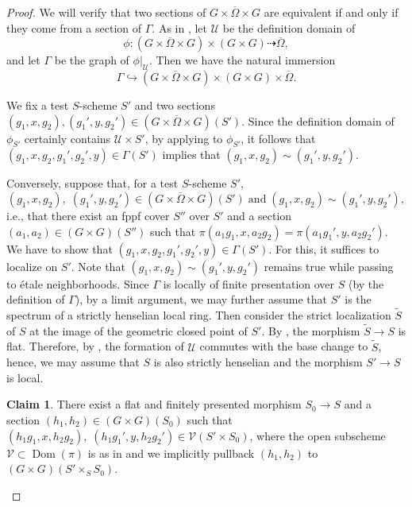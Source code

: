 \documentclass[11pt, reqno]{amsart}
\theoremstyle{plain}
\theoremstyle{definition}
\newtheorem{claim}[theorem]{Claim}
\DeclareMathOperator{\Dom}{Dom} %
\begin{document}
\begin{proof}
    We will verify that two sections of $G\times \overline{\Omega}\times G$ are equivalent if and only if they come from a section of $\Gamma$.
    As in , let $\mathcal{U}$ be the definition domain of $$\phi\colon(G\times\overline{\Omega}\times G)\times(G\times G)\dashrightarrow \overline{\Omega},$$
    and let $\Gamma$ be the graph of $\phi\vert_{\mathcal{U}}$. Then we have the natural immersion
$$\Gamma\hookrightarrow(G\times\overline{\Omega}\times G)\times (G\times G)\times \overline{\Omega}.$$

   We fix a test $S$-scheme $S'$ and two sections
    $(g_1,x,g_2), (g_1',y,g_2')\in( G\times\overline{\Omega}\times G)(S')$. Since the definition domain of $\phi_{S'}$ certainly contains $\mathcal{U}\times S'$, by applying  to $\phi_{S'}$, it follows that $(g_1,x,g_2,g_1',g_2',y)\in\Gamma(S')$ implies that $(g_1,x,g_2)\sim (g_1',y,g_2')$.
    
    Conversely, suppose that, for a test $S$-scheme $S'$, 
    $$(g_1,x,g_2),\; (g_1',y,g_2')\in( G\times\overline{\Omega}\times G)(S')\; \text{and} \; (g_1,x,g_2)\sim (g_1',y,g_2'),$$
    i.e., that there exist an fppf cover $S''$ over $S'$ and a section $(a_1,a_2)\in ( G\times G)(S'')$ such that
$\pi(a_1g_1,x,a_2g_2)=\pi(a_1g_1',y,a_2g_2').$ We have to show that $(g_1,x,g_2,g_1',g_2',y)\in\Gamma(S')$. For this, it suffices to localize on $S'$. Note that $(g_1,x,g_2)\sim (g_1',y,g_2')$ remains true while passing to étale neighborhoods. Since $\Gamma$ is locally of finite presentation over $S$ (by the definition of $\Gamma$), by a limit argument, we may further assume that $S'$ is the spectrum of a strictly henselian local ring. Then consider the strict localization $\widetilde{S}$ of $S$ at the image of the geometric closed point of $S'$. By \cite[proposition~18.8.8 (iii), (iv)]{EGAIV4}, the morphism $\widetilde{S}\longrightarrow S$ is flat. Therefore, by \cite[2.5, Proposition~6]{BLR}, the formation of $\mathcal{U}$ commutes with the base change to $\widetilde{S}$, hence, we may assume that $S$ is also strictly henselian and the morphism $S'\rightarrow S$ is local. 

\begin{claim}\label{claimquasisection}
    There exist a flat and finitely presented morphism $S_0\longrightarrow S$ and a section $(h_1,h_2)\in( G\times G)(S_0)$ such that $(h_1g_1,x,h_2g_2),\;(h_1g_1',y,h_2g_2')\in \mathcal{V}(S'\times S_0)$, where the open subscheme $\mathcal{V}\subset \Dom(\pi)$ is as in  and we implicitly pullback $(h_1,h_2)$ to $(G\times G)(S'\times_S S_0)$. 
\end{claim}


\end{proof}
\end{document}
